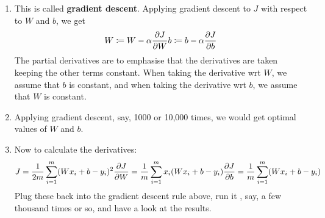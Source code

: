 \documentclass{article}
\begin{document}
\begin{enumerate}
                \item This is called \textbf{gradient descent}. Applying gradient descent to $J$ with respect to $W$ and $b$,
                we get
                \[
                    W \coloneqq W - \alpha \frac {\partial J}{\partial W}
                    \\
                    b \coloneqq b - \alpha \frac {\partial J}{\partial b}  
                \]
                The partial derivatives are to emphasise that the derivatives are taken keeping the other terms constant.
                When taking the derivative wrt $W$, we assume that $b$ is constant, and when taking the derivative wrt $b$, we assume that $W$ is constant.
                \item Applying gradient descent, say, 1000 or 10,000 times, we would get optimal values of $W$ and $b$.
                \item Now to calculate the derivatives:
                \[
                    J = \frac {1}{2m} \sum _{i = 1}^{m} (Wx_i + b - y_i)^2 \\
                    \frac {\partial J}{\partial W} = \frac {1} {m} \sum _{i = 1}^{m} x_i(Wx_i + b - y_i) \\
                    \frac {\partial J}{\partial b} = \frac {1} {m} \sum _{i = 1}^{m} (Wx_i + b - y_i)  
                \]
                Plug these back into the gradient descent rule above, run it , say, a few thousand times or so, and have a look at the results.
            \end{enumerate}
\end{document}
